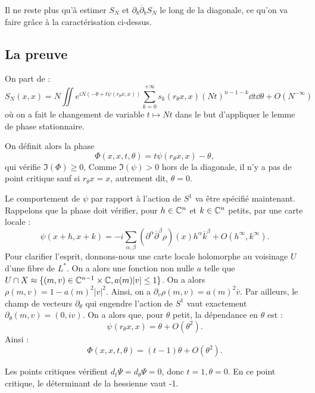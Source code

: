 Il ne reste plus qu'à estimer $S_N$ et $\partial_b \overline{\partial}_bS_N$ le long de la diagonale, ce qu'on va faire grâce à la caractérisation ci-dessus.

\subsection{La preuve}
On part de :
\begin{equation*}
	S_N(x,x)=N\iint e^{iN(-\theta +
          t\psi(r_{\theta}x,x))}\sum_{k=0}^{+\infty}s_k(r_{\theta}x,x)(Nt)^{n-1-k}\dd
        t\dd\theta + O(N^{-\infty})
\end{equation*}
où on a fait le changement de variable $t \mapsto Nt$ dans le but d'appliquer le lemme de phase stationnaire.

On définit alors la phase
\begin{equation*}
	\Phi(x,x,t,\theta)=t\psi(r_{\theta}x,x)-\theta,
\end{equation*}
qui vérifie $\Im(\Phi) \geq 0$, Comme $\Im(\psi) > 0$ hors de la diagonale, il n'y a pas de point critique sauf si $r_{\theta}x=x$, autrement dit, $\theta=0$.

Le comportement de $\psi$ par rapport à l'action de $S^1$ va être spécifié maintenant. Rappelons que la phase doit vérifier, pour $h\in \mathbb{C}^n$ et $k \in \mathbb{C}^n$ petits, par une carte locale :
\begin{equation}
  \psi(x+h,x+k) =-i\sum_{\alpha,\beta}(\partial^{\alpha}\overline{\partial}^{\beta}\rho)(x)h^{\alpha}\overline{k}^{\beta} + O(h^{\infty},k^{\infty}).
\end{equation}
Pour clarifier l'esprit, donnons-nous une carte locale holomorphe au voisinage $U$ d'une fibre de $L^*$. On a alors une fonction non nulle $a$ telle que $U \cap X \approx \{(m,v)\in \mathbb{C}^{n-1}\times \mathbb{C}, a(m)|v|\leq 1\}$. On a alors $\rho(m,v)=1-a(m)^2|v|^2$. Ainsi, on a $\partial_v \rho(m,v) = a(m)^2\overline{v}$.
Par ailleurs, le champ de vecteurs $\partial_{\theta}$ qui engendre l'action de $S^1$ vaut exactement $\partial_{\theta}(m,v)=(0,iv)$. On a alors que, pour $\theta$ petit, la dépendance en $\theta$ est :
\begin{equation*}
  \psi(r_{\theta} x,x) = \theta + O(\theta^{2}).
\end{equation*}
 Ainsi :
\begin{equation*}
	\Phi(x,x,t,\theta) =(t-1)\theta + O(\theta^2).
\end{equation*}

Les points critiques vérifient $d_t\Psi = d_\theta \Psi =0$, donc $t=1, \theta=0$. En ce point critique, le déterminant de la hessienne vaut -1.

